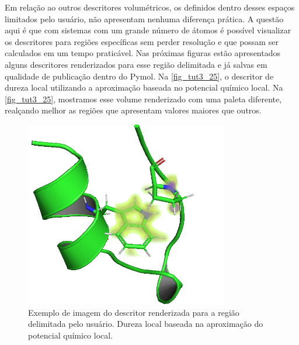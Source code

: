 \documentclass[a4paper,11pt]{refart}
\begin{document}
Em relação ao outros descritores volumétricos, os definidos dentro desses espaços limitados pelo usuário, não apresentam nenhuma diferença prática. A questão aqui é que com sistemas com um grande número de átomos é possível visualizar os descritores para regiões específicas sem perder resolução e que possam ser calculados em um tempo praticável. Nas próximas figuras estão apresentados alguns descritores renderizados para esse região delimitada e já salvas em qualidade de publicação dentro do Pymol. Na \autoref{fig_tut3_25}, o descritor de dureza local utilizando a aproximação baseada no potencial químico local. Na \autoref{fig_tut3_25}, mostramos esse volume renderizado com uma paleta diferente, realçando melhor as regiões que apresentam valores maiores que outros. 

\hspace*{-\leftmarginwidth}
\begin{minipage}{\fullwidth}
	\begin{figure}[H]
		\begin{center}
			\includegraphics[width=3.5in]{images/tut3_img26}
			\caption{Exemplo de imagem do descritor renderizada para a região delimitada pelo usuário. Dureza local baseada na aproximação do potencial químico local.}
			\label{fig_tut3_25}
		\end{center}
	\end{figure}
\end{minipage}
\end{document}
